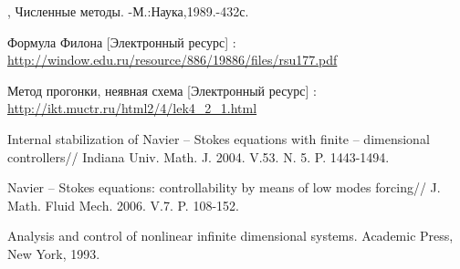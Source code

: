\begin{thebibliography}{}
    , Численные методы.
            -М.:Наука,1989.-432с.

     Формула Филона [Электронный ресурс] : 
        \url{http://window.edu.ru/resource/886/19886/files/rsu177.pdf}

     Метод прогонки, неявная схема [Электронный ресурс] : 
        \url{http://ikt.muctr.ru/html2/4/lek4_2_1.html}

     Internal stabilization of Navier – Stokes 
        equations with finite – dimensional controllers// Indiana Univ. 
        Math. J. 2004. V.53. N. 5. P. 1443-1494.

     Navier – Stokes equations: 
        controllability by means of low modes forcing// J. Math. Fluid Mech. 
        2006. V.7. P. 108-152.

     Analysis and control of nonlinear infinite dimensional systems.
        Academic Press, New York, 1993.

\end{thebibliography}

\endgroup
